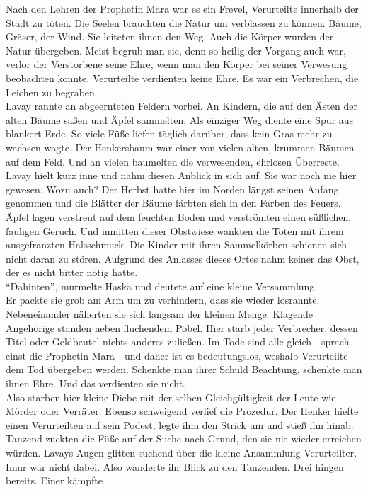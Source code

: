 Nach den Lehren der Prophetin Mara war es ein Frevel, Verurteilte innerhalb der Stadt zu töten. Die 
Seelen brauchten die Natur um verblassen zu können. Bäume, Gräser, der Wind. Sie leiteten ihnen den 
Weg. Auch die Körper wurden der Natur übergeben. Meist begrub man sie, denn so heilig der Vorgang 
auch war, verlor der Verstorbene seine Ehre, wenn man den Körper bei seiner Verwesung beobachten 
konnte. Verurteilte verdienten keine Ehre. Es war ein Verbrechen, die Leichen zu begraben.\\
Lavay rannte an abgeernteten Feldern vorbei. An Kindern, die auf den Ästen der alten Bäume saßen 
und Äpfel sammelten. Als einziger Weg diente eine Spur aus blankert Erde. So viele Füße liefen 
täglich darüber, dass kein Gras mehr zu wachsen wagte. Der Henkersbaum war einer von vielen alten, 
krummen Bäumen auf dem Feld. Und an vielen baumelten die verwesenden, ehrlosen Überreste. Lavay 
hielt kurz inne und nahm diesen Anblick in sich auf. Sie war noch nie hier gewesen. Wozu auch? 
Der Herbst hatte hier im Norden längst seinen Anfang genommen und die Blätter der Bäume färbten 
sich in den Farben des Feuers. Äpfel lagen verstreut auf dem feuchten Boden und verströmten einen 
süßlichen, fauligen Geruch. Und inmitten dieser Obstwiese wankten die Toten mit ihrem ausgefranzten 
Halsschmuck. Die Kinder mit ihren Sammelkörben schienen sich nicht daran zu stören. Aufgrund des 
Anlasses dieses Ortes nahm keiner das Obst, der es nicht bitter nötig hatte. \\
``Dahinten'', murmelte Haska und deutete auf eine kleine Versammlung. \\
Er packte sie grob am Arm um zu verhindern, dass sie wieder losrannte. Nebeneinander näherten sie 
sich langsam der kleinen Menge. Klagende Angehörige standen neben fluchendem Pöbel. Hier starb 
jeder Verbrecher, dessen Titel oder Geldbeutel nichts anderes zuließen. Im Tode sind alle gleich - 
sprach einst die Prophetin Mara - und daher ist es bedeutungslos, weshalb Verurteilte dem Tod 
übergeben werden. Schenkte man ihrer Schuld Beachtung, schenkte man ihnen Ehre. Und das verdienten 
sie nicht. \\
Also starben hier kleine Diebe mit der selben Gleichgültigkeit der Leute wie Mörder oder Verräter. 
Ebenso schweigend verlief die Prozedur. Der Henker hiefte einen Verurteilten auf sein Podest, legte 
ihm den Strick um und stieß ihn hinab. Tanzend zuckten die Füße auf der Suche nach Grund, den sie 
nie wieder erreichen würden. Lavays Augen glitten suchend über die kleine Ansammlung Verurteilter. 
Imur war nicht dabei. Also wanderte ihr Blick zu den Tanzenden. Drei hingen bereits. Einer kämpfte 
